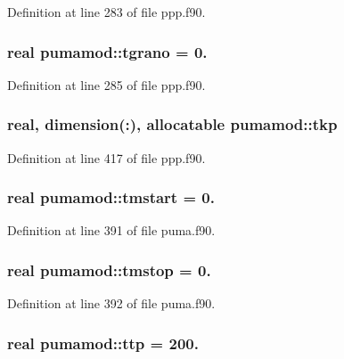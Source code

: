 \-Definition at line 283 of file ppp.\-f90.

\hypertarget{classpumamod_aacd677d71f3a3b99afa150ea6e76ffd7}{
\subsubsection[{tgrano}]{\setlength{\rightskip}{0pt plus 5cm}real {\bf pumamod\-::tgrano} = 0.}}
\label{classpumamod_aacd677d71f3a3b99afa150ea6e76ffd7}


\-Definition at line 285 of file ppp.\-f90.

\hypertarget{classpumamod_af17f19dbdc2165bfaca19bed26fd393d}{
\subsubsection[{tkp}]{\setlength{\rightskip}{0pt plus 5cm}real, dimension(\-:), allocatable {\bf pumamod\-::tkp}}}
\label{classpumamod_af17f19dbdc2165bfaca19bed26fd393d}


\-Definition at line 417 of file ppp.\-f90.

\hypertarget{classpumamod_ab552a94bc8d5d3e4a56303ac4249b894}{
\subsubsection[{tmstart}]{\setlength{\rightskip}{0pt plus 5cm}real {\bf pumamod\-::tmstart} = 0.}}
\label{classpumamod_ab552a94bc8d5d3e4a56303ac4249b894}


\-Definition at line 391 of file puma.\-f90.

\hypertarget{classpumamod_a6b2cc93bbb820f9aa438282188e75eef}{
\subsubsection[{tmstop}]{\setlength{\rightskip}{0pt plus 5cm}real {\bf pumamod\-::tmstop} = 0.}}
\label{classpumamod_a6b2cc93bbb820f9aa438282188e75eef}


\-Definition at line 392 of file puma.\-f90.

\hypertarget{classpumamod_a7e20a606bb6a44f41a19e4b5f5a8cd3c}{
\subsubsection[{ttp}]{\setlength{\rightskip}{0pt plus 5cm}real {\bf pumamod\-::ttp} = 200.}}
\label{classpumamod_a7e20a606bb6a44f41a19e4b5f5a8cd3c}


